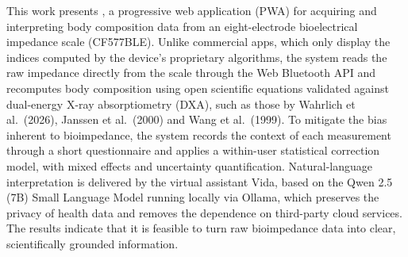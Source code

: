 This work presents \sintonia, a progressive web application (PWA) for acquiring and
interpreting body composition data from an eight-electrode bioelectrical impedance
scale (CF577BLE). Unlike commercial apps, which only display the indices computed by
the device's proprietary algorithms, the system reads the raw impedance directly from
the scale through the Web Bluetooth API and recomputes body composition using open
scientific equations validated against dual-energy X-ray absorptiometry (DXA), such
as those by Wahrlich et al.\ (2026), Janssen et al.\ (2000) and Wang et al.\ (1999).
To mitigate the bias inherent to bioimpedance, the system records the context of each
measurement through a short questionnaire and applies a within-user statistical
correction model, with mixed effects and uncertainty quantification. Natural-language
interpretation is delivered by the virtual assistant Vida, based on the Qwen 2.5 (7B)
Small Language Model running locally via Ollama, which preserves the privacy of health
data and removes the dependence on third-party cloud services. The results indicate
that it is feasible to turn raw bioimpedance data into clear, scientifically grounded
information.
